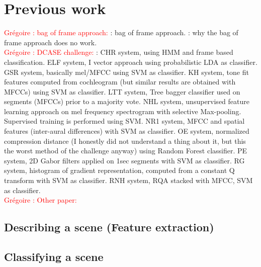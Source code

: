 \documentclass[journal]{IEEEtran}
\newcommand{\gl}[1]{\textcolor{red}{Gr\'egoire : #1}}
\begin{document}
\section{Previous work}

\gl{bag of frame approach:} \cite{aucouturier2007bag}: bag of frame approach. \cite{lagrange:hal-01082501}: why the bag of frame approach does no work. \\



\gl{DCASE challenge:} \cite{chum2013ieee}: CHR system, using HMM and frame based classification. \cite{elizalde2013vector} ELF system, I vector approach using probabilistic LDA as classifier. \cite{geiger2013large} GSR system, basically mel/MFCC using SVM as classifier. \cite{krijnders2013tone} KH system, tone fit features computed from cochleogram (but similar results are obtained with MFCCs) using SVM as classifier. \cite{li2013auditory} LTT system, Tree bagger classifier used on segments (MFCCs) prior to a majority vote. \cite{lee2013acoustic} NHL system, unsupervised feature learning approach on mel frequency spectrogram with selective Max-pooling. Supervised training is performed using SVM. \cite{nogueira2013sound} NR1 system, MFCC and spatial features (inter-aural differences) with SVM as classifier. \cite{olivetti2013wonder} OE system, normalized compression distance (I honestly did not understand a thing about it, but this the worst method of the challenge anyway) using  Random Forest  classifier.  \cite{patil2013multiresolution} PE system, 2D Gabor filters applied on 1sec segments with SVM as classifier.  \cite{rakotomamonjy2015histogram} RG system, histogram of gradient representation, computed from a constant Q transform with SVM as classifier.  \cite{roma2013recurrence} RNH system, RQA stacked with MFCC, SVM as classifier. \\

\gl{Other paper:} \cite{jiang2005svm, kalinli2009saliency, su2011environmental, barchiesi2015acoustic, ye2015acoustic, bisot2015hog, chakrabarty2015exploring, xue2015auditory, bisot2016acoustic}

\subsection{Describing a scene (Feature extraction)}

\subsection{Classifying a scene}
\end{document}
